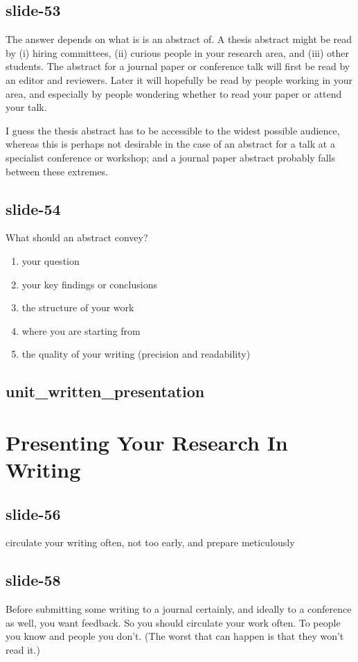 \documentclass[12pt,\papersize]{extarticle}
\begin{document}
\subsection{slide-53}
The answer depends on what is is an abstract of.
A thesis abstract might be read by (i) hiring committees, (ii) curious people in your research area,
and (iii) other students.
The abstract for a journal paper or conference talk will first be read by an editor and reviewers.
Later it will hopefully be read by people working in your area, and especially by people
wondering whether to read your paper or attend your talk.
 
I guess the thesis abstract has to be accessible to the widest possible audience, whereas
this is perhaps not desirable in the case of an abstract for a talk at a specialist conference or 
workshop; and a journal paper abstract probably falls between these extremes.
 
\subsection{slide-54}
What should an abstract convey?
\begin{enumerate}
\item your question
\item your key findings or conclusions
\item the structure of your work
\item where you are starting from
\item the quality of your writing (precision and readability)
\end{enumerate}
 
\subsection{unit\_written\_presentation}
 
 
\section{Presenting Your Research In Writing}
 
\subsection{slide-56}
circulate your writing often, not too early, and prepare meticulously
 
\subsection{slide-58}
Before submitting some writing to a journal certainly, and ideally to a conference as well,
you want feedback.
So you should circulate your work often.
To people you know and people you don't.  (The worst that can happen is that they won't read it.)
 
\end{document}
